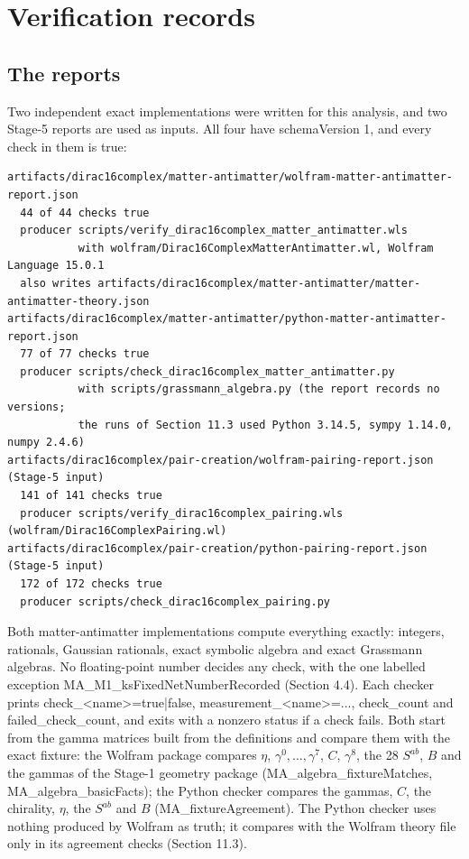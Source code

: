 \documentclass[11pt]{article}
\begin{document}
\section{Verification records}

\subsection{The reports}

Two independent exact implementations were written for this analysis, and two Stage-5 reports are used as inputs. All four have schemaVersion 1, and every check in them is true:

\begin{Verbatim}[fontsize=\small]
artifacts/dirac16complex/matter-antimatter/wolfram-matter-antimatter-report.json
  44 of 44 checks true
  producer scripts/verify_dirac16complex_matter_antimatter.wls
           with wolfram/Dirac16ComplexMatterAntimatter.wl, Wolfram Language 15.0.1
  also writes artifacts/dirac16complex/matter-antimatter/matter-antimatter-theory.json
artifacts/dirac16complex/matter-antimatter/python-matter-antimatter-report.json
  77 of 77 checks true
  producer scripts/check_dirac16complex_matter_antimatter.py
           with scripts/grassmann_algebra.py (the report records no versions;
           the runs of Section 11.3 used Python 3.14.5, sympy 1.14.0, numpy 2.4.6)
artifacts/dirac16complex/pair-creation/wolfram-pairing-report.json (Stage-5 input)
  141 of 141 checks true
  producer scripts/verify_dirac16complex_pairing.wls (wolfram/Dirac16ComplexPairing.wl)
artifacts/dirac16complex/pair-creation/python-pairing-report.json (Stage-5 input)
  172 of 172 checks true
  producer scripts/check_dirac16complex_pairing.py
\end{Verbatim}

Both matter-antimatter implementations compute everything exactly: integers, rationals, Gaussian rationals, exact symbolic algebra and exact Grassmann algebras. No floating-point number decides any check, with the one labelled exception MA\_M1\_ksFixedNetNumberRecorded (Section 4.4). Each checker prints check\_<name>=true|false, measurement\_<name>=..., check\_count and failed\_check\_count, and exits with a nonzero status if a check fails. Both start from the gamma matrices built from the definitions and compare them with the exact fixture: the Wolfram package compares $\eta$, $\gamma^0,\dots,\gamma^7$, $C$, $\gamma^8$, the 28 $S^{ab}$, $B$ and the gammas of the Stage-1 geometry package (MA\_algebra\_fixtureMatches, MA\_algebra\_basicFacts); the Python checker compares the gammas, $C$, the chirality, $\eta$, the $S^{ab}$ and $B$ (MA\_fixtureAgreement). The Python checker uses nothing produced by Wolfram as truth; it compares with the Wolfram theory file only in its agreement checks (Section 11.3).
\end{document}
